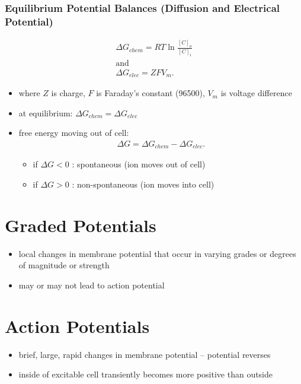 \documentclass[10pt]{article}
\begin{document}
\subsubsection*{Equilibrium Potential Balances (Diffusion and Electrical Potential)}
\begin{gather*}
    \Delta G_{chem} = RT \ln \frac{[C]_o}{[C]_i} \\ 
    \text{and} \\ 
    \Delta G_{elec} = ZFV_m
.\end{gather*}
\begin{itemize}
    \item where $Z$ is charge, $F$ is Faraday's constant (96500), $V_m$ is voltage difference
    \item at equilibrium: $\Delta G_{chem} = \Delta G_{elec}$ 
    \item free energy moving out of cell:
        \begin{align*}
            \Delta G = \Delta G_{chem} - \Delta G_{elec}
        .\end{align*}
        \begin{itemize}
            \item if $\Delta G < 0$ : spontaneous (ion moves out of cell)
            \item if $\Delta G > 0$ : non-spontaneous (ion moves into cell)
        \end{itemize}
\end{itemize}



\section{Graded Potentials}
\begin{itemize}
    \item local changes in membrane potential that occur in varying grades or degrees of magnitude or strength
    \item may or may not lead to action potential
\end{itemize}

\section{Action Potentials}
\begin{itemize}
    \item brief, large, rapid changes in membrane potential -- potential reverses
    \item inside of excitable cell transiently becomes more positive than outside
\end{itemize}
\end{document}
